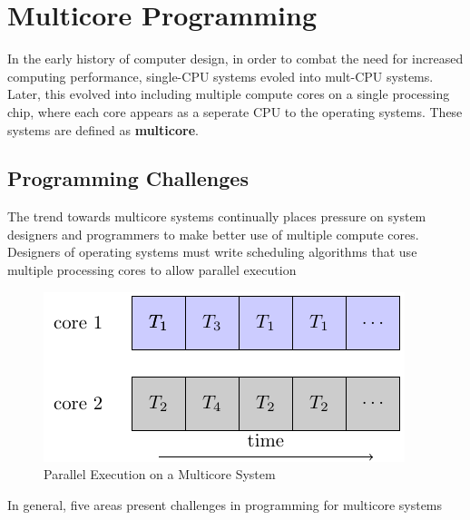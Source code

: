 \documentclass[oneside]{book}
\begin{document}
        \section{Multicore Programming}
            In the early history of computer design, in order to combat the need for increased computing performance, single-CPU systems
            evoled into mult-CPU systems. Later, this evolved into including multiple compute cores on a single processing chip, where each core
            appears as a seperate CPU to the operating systems. These systems are defined as \textbf{multicore}.
            \subsection{Programming Challenges}
                The trend towards multicore systems continually places pressure on system designers and programmers to make better use of
                multiple compute cores. Designers of operating systems must write scheduling algorithms that use multiple processing cores
                to allow parallel execution
                \begin{figure}[H]
                    \centering
                    \includegraphics{figures/multicore_exec.pdf}
                    \caption{Parallel Execution on a Multicore System}
                \end{figure}
            In general, five areas present challenges in programming for multicore systems
\end{document}
